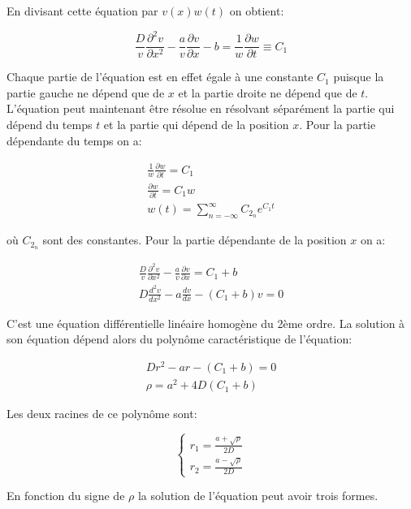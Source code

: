 \documentclass[a4paper, 12pt]{report}
\begin{document}
En divisant cette équation par $v(x) w(t)$ on obtient:

\begin{equation}
  \frac{D}{v} \frac{\partial^2 v}{\partial x^2} - \frac{a}{v} \frac{\partial v}{\partial x} -b = \frac{1}{w} \frac{\partial w}{\partial t} \equiv C_1
\end{equation}

Chaque partie de l'équation est en effet égale à une constante $C_1$ puisque
la partie gauche ne dépend que de $x$ et la partie droite ne dépend que de $t$.
L'équation peut maintenant être résolue en résolvant séparément la partie
qui dépend du temps $t$ et la partie qui dépend de la position $x$. Pour la
partie dépendante du temps on a:

\begin{align}
\frac{1}{w} \frac{\partial w}{\partial t} = C_1\\
\frac{\partial w}{\partial t} = C_1 w\\
\boxed{w(t) = \sum_{n=-\infty}^{\infty} C_{2_n} e^{C_1 t}}
\end{align}

où $C_{2_n}$ sont des constantes. Pour la partie dépendante de la position $x$
on a:

\begin{align}
  \frac{D}{v} \frac{\partial^2v}{\partial x^2} - \frac{a}{v} \frac{\partial v}{\partial x} = C_1 + b\\
  D \frac{d^2v}{d x^2} - a \frac{d v}{d x} - (C_1 + b) v = 0
\end{align}

C'est une équation différentielle linéaire homogène du 2ème ordre. La solution à
son équation dépend alors du polynôme caractéristique de l'équation:

\begin{align}
  D r^2 - a r - (C_1 + b) = 0\\
  \rho = a^2 + 4 D (C_1 + b)
\end{align}

Les deux racines de ce polynôme sont:

\begin{equation}
  \left \{
  \begin{aligned}
  r_1 = \frac{a + \sqrt{\rho}}{2 D}\\
  r_2 = \frac{a - \sqrt{\rho}}{2 D}
  \end{aligned}
  \right.
\end{equation}

En fonction du signe de $\rho$ la solution de l'équation peut avoir trois formes.
\end{document}
